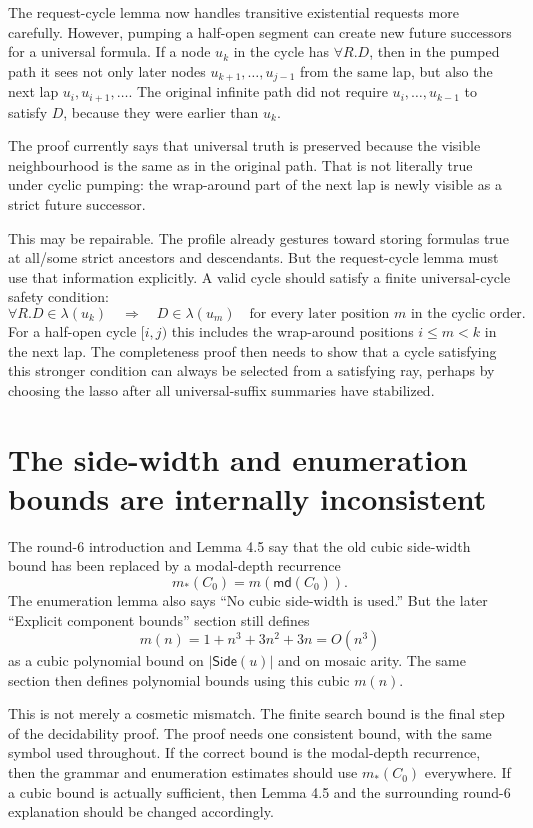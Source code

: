 \documentclass[11pt]{article}
\newcommand{\Side}{\mathsf{Side}}
\newcommand{\md}{\mathsf{md}}
\begin{document}
The request-cycle lemma now handles transitive existential requests more
carefully.  However, pumping a half-open segment can create new future
successors for a universal formula.  If a node $u_k$ in the cycle has
$\forall R.D$, then in the pumped path it sees not only later nodes
$u_{k+1},\ldots,u_{j-1}$ from the same lap, but also the next lap
$u_i,u_{i+1},\ldots$.  The original infinite path did not require $u_i,
\ldots,u_{k-1}$ to satisfy $D$, because they were earlier than $u_k$.

The proof currently says that universal truth is preserved because the visible
neighbourhood is the same as in the original path.  That is not literally true
under cyclic pumping: the wrap-around part of the next lap is newly visible as
a strict future successor.

This may be repairable.  The profile already gestures toward storing formulas
true at all/some strict ancestors and descendants.  But the request-cycle lemma
must use that information explicitly.  A valid cycle should satisfy a finite
universal-cycle safety condition:
\[
  \forall R.D\in\lambda(u_k)
  \quad\Longrightarrow\quad
  D\in\lambda(u_m)
  \quad\text{for every later position }m\text{ in the cyclic order.}
\]
For a half-open cycle $[i,j)$ this includes the wrap-around positions
$i\le m<k$ in the next lap.  The completeness proof then needs to show that a
cycle satisfying this stronger condition can always be selected from a
satisfying ray, perhaps by choosing the lasso after all universal-suffix
summaries have stabilized.

\section{The side-width and enumeration bounds are internally inconsistent}

The round-6 introduction and Lemma 4.5 say that the old cubic side-width bound
has been replaced by a modal-depth recurrence
\[
  m_*(C_0)=m(\md(C_0)).
\]
The enumeration lemma also says ``No cubic side-width is used.''  But the later
``Explicit component bounds'' section still defines
\[
  m(n)=1+n^3+3n^2+3n=O(n^3)
\]
as a cubic polynomial bound on $|\Side(u)|$ and on mosaic arity.  The same
section then defines polynomial bounds using this cubic $m(n)$.

This is not merely a cosmetic mismatch.  The finite search bound is the final
step of the decidability proof.  The proof needs one consistent bound, with the
same symbol used throughout.  If the correct bound is the modal-depth recurrence,
then the grammar and enumeration estimates should use $m_*(C_0)$ everywhere.
If a cubic bound is actually sufficient, then Lemma 4.5 and the surrounding
round-6 explanation should be changed accordingly.
\end{document}
